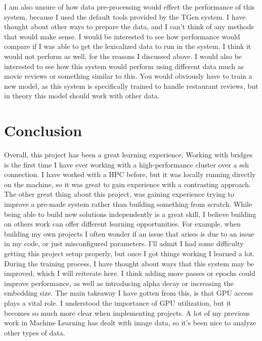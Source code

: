 \documentclass[12pt]{article}
\begin{document}
I am also unsure of how data pre-processing would effect the performance of this system, because I used the default tools provided by the TGen system. I have thought about other ways to prepare the data, and I can't think of any methods that would make sense. I would be interested to see how performance would compare if I was able to get the lexicalized data to run in the system. I think it would not perform as well, for the reasons I discussed above. I would also be interested to see how this system would perform using different data much as movie reviews or something similar to this. You would obviously have to train a new model, as this system is specifically trained to handle restaurant reviews, but in theory this model should work with other data. \\

\section{Conclusion}
Overall, this project has been a great learning experience. Working with bridges is the first time I have ever working with a high-performance cluster over a ssh connection. I have worked with a HPC before, but it was locally running directly on the machine, so it was great to gain experience with a contrasting approach. The other great thing about this project, was gaining experience trying to improve a pre-made system rather than building something from scratch. While being able to build new solutions independently is a great skill, I believe building on others work can offer different learning opportunities. For example, when building my own projects I often wonder if an issue that arises is due to an issue in my code, or just misconfigured parameters. I'll admit I had some difficulty getting this project setup properly, but once I got things working I learned a lot. \\

During the training process, I have thought about ways that this system may be improved, which I will reiterate here. I think adding more passes or epochs could improve performance, as well as introducing alpha decay or increasing the embedding size. The main takeaway I have gotten from this, is that GPU access plays a vital role. I understood the importance of GPU utilization, but it becomes so much more clear when implementing projects. A lot of my previous work in Machine Learning has dealt with image data, so it's been nice to analyze other types of data. 
\end{document}
